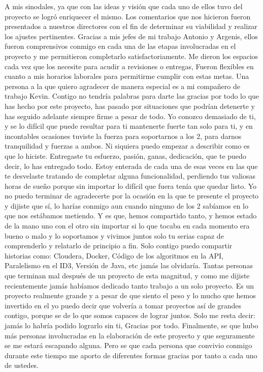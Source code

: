 A mis sinodales, ya que con las ideas y visión que cada uno de ellos tuvo del proyecto se logró enriquecer el mismo. Los comentarios que nos hicieron fueron presentados a nuestros directores con el fin de determinar su viabilidad y realizar los ajustes pertinentes.
Gracias a mis jefes de mi trabajo Antonio y Argenis, ellos fueron comprensivos conmigo en cada una de las etapas involucradas en el proyecto y me permitieron completarlo satisfactoriamente. Me dieron los espacios cada vez que los necesite para acudir a revisiones o entregas, Fueron flexibles en cuanto a mis horarios laborales para permitirme cumplir con estas metas.
Una persona a la que quiero agradecer de manera especial es a mi compañero de trabajo Kevin.
Contigo no tendría palabras para darte las gracias por todo lo que has hecho por este proyecto, has pasado por situaciones que podrían detenerte y has seguido adelante siempre firme a pesar de todo. 
Yo conozco demasiado de ti, y se lo difícil que puede resultar para ti mantenerte fuerte tan solo para ti, y en incontables ocasiones tuviste la fuerza para soportarnos a los 2, para darnos tranquilidad y fuerzas a ambos. Ni siquiera puedo empezar a describir como es que lo hiciste.
Entregaste tu esfuerzo, pasión, ganas, dedicación, que te puedo decir, lo has entregado todo. Estoy enterada de cada una de esas veces en las que te desvelaste tratando de completar alguna funcionalidad, perdiendo tus valiosas horas de sueño porque sin importar lo difícil que fuera tenía que quedar listo.
Yo no puedo terminar de agradecerte por la ocasión en la que te presente el proyecto y dijiste que sí, lo harías conmigo aun cuando ninguno de los 2 sabíamos en lo que nos estábamos metiendo.
Y es que, hemos compartido tanto, y hemos estado de la mano uno con el otro sin importar si lo que tocaba en cada momento era bueno o malo y lo soportamos y vivimos juntos solo tu serias capaz de comprenderlo y relatarlo de principio a fin. Solo contigo puedo compartir historias como: Cloudera, Docker, Código de los algoritmos en la API, Paralelismo en el ID3, Versión de Java, etc jamás las olvidaría.  
Tantas personas que terminan mal después de un proyecto de esta magnitud, y como me dijiste recientemente jamás habíamos dedicado tanto trabajo a un solo proyecto. Es un proyecto realmente grande y a pesar de que siento el peso y lo mucho que hemos invertido en el yo puedo decir que volvería a tomar proyectos así de grandes contigo, porque se de lo que somos capaces de lograr juntos.
Solo me resta decir: jamás lo habría podido lograrlo sin ti, Gracias por todo. 
Finalmente, se que hubo más personas involucradas en la elaboración de este proyecto y que seguramente se me estará escapando alguna. Pero se que cada persona que convivio conmigo durante este tiempo me aporto de diferentes formas gracias por tanto a cada uno de ustedes.

